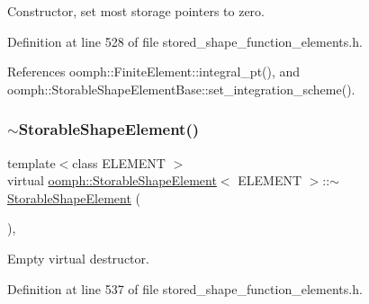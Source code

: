 Constructor, set most storage pointers to zero. 



Definition at line 528 of file stored\+\_\+shape\+\_\+function\+\_\+elements.\+h.



References oomph\+::\+Finite\+Element\+::integral\+\_\+pt(), and oomph\+::\+Storable\+Shape\+Element\+Base\+::set\+\_\+integration\+\_\+scheme().

\mbox{\label{classoomph_1_1StorableShapeElement_a86e2b5ec64139ef93c4f3397b4a60771}} 
\subsubsection{\texorpdfstring{$\sim$\+Storable\+Shape\+Element()}{~StorableShapeElement()}}
{\footnotesize\ttfamily template$<$class E\+L\+E\+M\+E\+NT $>$ \\
virtual \hyperlink{classoomph_1_1StorableShapeElement}{oomph\+::\+Storable\+Shape\+Element}$<$ E\+L\+E\+M\+E\+NT $>$\+::$\sim$\hyperlink{classoomph_1_1StorableShapeElement}{Storable\+Shape\+Element} (\begin{DoxyParamCaption}{ }\end{DoxyParamCaption})\hspace{0.3cm}{\ttfamily [inline]}, {\ttfamily [virtual]}}



Empty virtual destructor. 



Definition at line 537 of file stored\+\_\+shape\+\_\+function\+\_\+elements.\+h.

\mbox{\label{classoomph_1_1StorableShapeElement_ac242bdf9fd1206f017038216fdce37eb}} 
